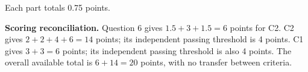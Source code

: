 Each part totals 0.75 points.

\par\vspace{3mm}\secInicio[][sec:q6]

\textbf{Scoring reconciliation.} Question 6 gives $1.5+3+1.5=6$ points for C2. C2 gives $2+2+4+6=14$ points; its independent passing threshold is 4 points. C1 gives $3+3=6$ points; its independent passing threshold is also 4 points. The overall available total is $6+14=20$ points, with no transfer between criteria.


